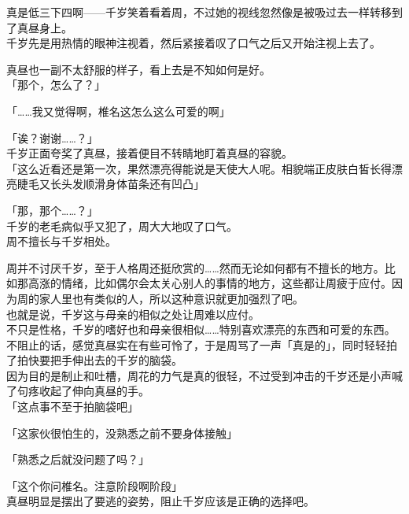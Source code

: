 真是低三下四啊——千岁笑着看着周，不过她的视线忽然像是被吸过去一样转移到了真昼身上。\\

千岁先是用热情的眼神注视着，然后紧接着叹了口气之后又开始注视上去了。

真昼也一副不太舒服的样子，看上去是不知如何是好。\\

「那个，怎么了？」

「……我又觉得啊，椎名这怎么这么可爱的啊」

「诶？谢谢……？」\\

千岁正面夸奖了真昼，接着便目不转睛地盯着真昼的容貌。\\

「这么近看还是第一次，果然漂亮得能说是天使大人呢。相貌端正皮肤白皙长得漂亮睫毛又长头发顺滑身体苗条还有凹凸」

「那，那个……？」\\

千岁的老毛病似乎又犯了，周大大地叹了口气。\\

周不擅长与千岁相处。

周并不讨厌千岁，至于人格周还挺欣赏的……然而无论如何都有不擅长的地方。比如那高涨的情绪，比如偶尔会太关心别人的事情的地方，这些都让周疲于应付。因为周的家人里也有类似的人，所以这种意识就更加强烈了吧。\\

也就是说，千岁这与母亲的相似之处让周难以应付。\\

不只是性格，千岁的嗜好也和母亲很相似……特别喜欢漂亮的东西和可爱的东西。\\

不阻止的话，感觉真昼实在有些可怜了，于是周骂了一声「真是的」，同时轻轻拍了拍快要把手伸出去的千岁的脑袋。\\

因为目的是制止和吐槽，周花的力气是真的很轻，不过受到冲击的千岁还是小声喊了句疼收起了伸向真昼的手。\\

「这点事不至于拍脑袋吧」

「这家伙很怕生的，没熟悉之前不要身体接触」

「熟悉之后就没问题了吗？」

「这个你问椎名。注意阶段啊阶段」\\

真昼明显是摆出了要逃的姿势，阻止千岁应该是正确的选择吧。\\

